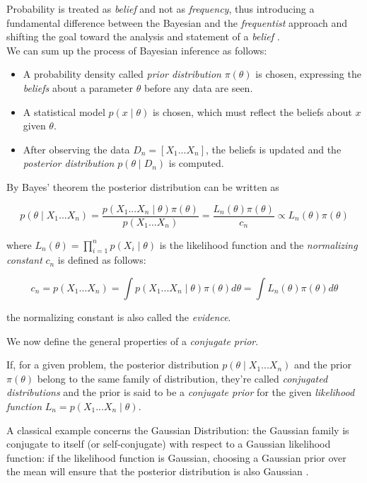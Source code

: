 \documentclass[12pt,openright,twoside,a4paper]{book}
\begin{document}
Probability is treated as \textit{belief} and not as \textit{frequency}, thus introducing a fundamental difference between the Bayesian and the \textit{frequentist} approach and shifting the goal toward the analysis and statement of a \textit{belief} \cite{SML}.
\\[12pt]
We can sum up the process of Bayesian inference as follows:
\begin{itemize}
\item A probability density called \textit{prior distribution} $\pi(\theta)$ is chosen, expressing the \textit{beliefs} about a parameter $\theta$ before any data are seen.
\item A statistical model $p(x\mid \theta)$ is chosen, which must reflect the beliefs about $x$ given $\theta$.
\item After observing the data $D_n=[X_1...X_n]$, the beliefs is updated and the \textit{posterior distribution} $p(\theta\mid D_n)$ is computed.
\end{itemize}

By Bayes' theorem the posterior distribution can be written as 

\begin{equation}
p(\theta\mid X_1...X_n)= \frac{p(X_1...X_n\mid \theta)\pi(\theta)}{p(X_1...X_n)}=\frac{L_n(\theta)\pi(\theta)}{c_n}\propto L_n(\theta)\pi(\theta)
\label{bayest}
\end{equation}

where $L_n(\theta)=\prod_{i=1}^n p(X_i\mid \theta)$ is the likelihood function and the \textit{normalizing constant} $c_n$ is defined as follows:

\begin{equation}
c_n=p(X_1...X_n)=\int p(X_1...X_n\mid \theta)\pi(\theta)d\theta=\int L_n(\theta)\pi(\theta)d\theta
\label{cnorm}
\end{equation}

the normalizing constant is also called the \textit{evidence}.

We now define the general properties of a \textit{conjugate prior}.

If, for a given problem, the posterior distribution $p(\theta\mid X_1...X_n)$ and the prior $\pi(\theta)$ belong to the same family of distribution, they're called \textit{conjugated distributions} and the prior is said to be a \textit{conjugate prior} for the given \textit{likelihood function} $L_n=p(X_1...X_n\mid \theta)$.

A classical example concerns the Gaussian Distribution: the Gaussian family is conjugate to itself (or self-conjugate) with respect to a Gaussian likelihood function: if the likelihood function is Gaussian, choosing a Gaussian prior over the mean will ensure that the posterior distribution is also Gaussian \cite{CBA}.
\end{document}
